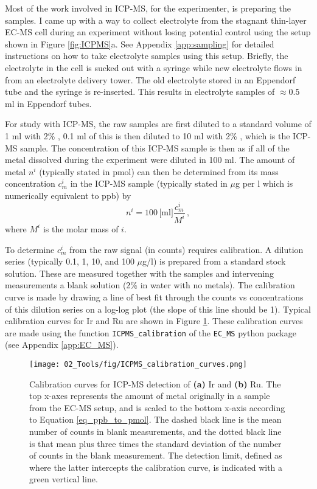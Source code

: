 Most of the work involved in ICP-MS, for the experimenter, is preparing the samples. I came up with a way to collect electrolyte from the stagnant thin-layer EC-MS cell during an experiment without losing potential control using the setup shown in Figure \ref{fig:ICPMS}a. See Appendix \ref{app:sampling} for detailed instructions on how to take electrolyte samples using this setup. Briefly, the electrolyte in the cell is sucked out with a syringe while new electrolyte flows in from an electrolyte delivery tower. The old electrolyte stored in an Eppendorf tube and the syringe is re-inserted. This results in electrolyte samples of $\approx 0.5$ ml in Eppendorf tubes. 

For study with ICP-MS, the raw samples are first diluted to a standard volume of 1 ml with 2\% , 0.1 ml of this is then diluted to 10 ml with 2\% , which is the ICP-MS sample. The concentration of this ICP-MS sample is then as if all of the metal dissolved during the experiment were diluted in 100 ml. The amount of metal $n^i$ (typically stated in pmol) can then be determined from its mass concentration $c_m^i$ in the ICP-MS sample (typically stated in $\mu$g per l which is numerically equivalent to ppb) by
\begin{equation}
n^i = 100\,\text{[ml]}\frac{c_m^i}{M^i}\,,\label{eq:ppb_to_pmol}
\end{equation}
where $M^i$ is the molar mass of $i$.

To determine $c_m^i$ from the raw signal (in counts) requires calibration. A dilution series (typically 0.1, 1, 10, and 100 $\mu$g/l) is prepared from a standard stock solution. These are measured together with the samples and intervening measurements a blank solution (2\%  in water with no metals). The calibration curve is made by drawing a line of best fit through the counts vs concentrations of this dilution series on a log-log plot (the slope of this line should be 1). Typical calibration curves for Ir and Ru are shown in Figure \ref{fig:ICPMS_cal}. These calibration curves are made using the function \texttt{ICPMS\_calibration} of the \texttt{EC\_MS} python package (see Appendix \ref{app:EC_MS}).

\begin{figure}[h!]
	\centering
	\texttt{[image: 02\_Tools/fig/ICPMS\_calibration\_curves.png]}
	\caption{Calibration curves for ICP-MS detection of \textbf{(a)} Ir and \textbf{(b)} Ru. The top x-axes represents the amount of metal originally in a sample from the EC-MS setup, and is scaled to the bottom x-axis according to Equation \ref{eq_ppb_to_pmol}. The dashed black line is the mean number of counts in blank measurements, and the dotted black line is that mean plus three times the standard deviation of the number of counts in the blank measurement. The detection limit, defined as where the latter intercepts the calibration curve, is indicated with a green vertical line.}
	\label{fig:ICPMS_cal}
\end{figure}

